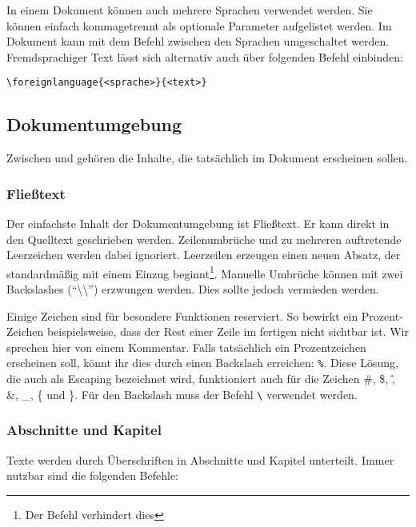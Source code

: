 In einem Dokument können auch mehrere Sprachen verwendet werden.
Sie können einfach kommagetrennt als optionale Parameter aufgelistet werden.
Im Dokument kann mit dem Befehl \texttt{} zwischen den Sprachen umgeschaltet werden.
Fremdsprachiger Text lässt sich alternativ auch über folgenden Befehl einbinden: 
\begin{verbatim}
\foreignlanguage{<sprache>}{<text>}
\end{verbatim}

\subsection{Dokumentumgebung}

Zwischen \texttt{} und \texttt{} gehören die Inhalte, die tatsächlich im Dokument erscheinen sollen.

\subsubsection{Fließtext}
Der einfachste Inhalt der Dokumentumgebung ist Fließtext.
Er kann direkt in den Quelltext geschrieben werden.
Zeilenumbrüche und zu mehreren auftretende Leerzeichen werden dabei ignoriert.
Leerzeilen erzeugen einen neuen Absatz, der standardmäßig mit einem Einzug beginnt\footnote{Der Befehl \texttt{\noindent} verhindert dies}.
Manuelle Umbrüche können mit zwei Backslashes (\enquote{\textbackslash\textbackslash}) erzwungen werden.
Dies sollte jedoch vermieden werden.

Einige Zeichen sind für besondere Funktionen reserviert. 
So bewirkt ein Prozent-Zeichen beispielsweise, dass der Rest einer Zeile im fertigen  nicht sichtbar ist.
Wir sprechen hier von einem Kommentar.
Falls tatsächlich ein Prozentzeichen erscheinen soll, könnt ihr dies durch einen Backslash erreichen: \texttt{\%}.
Diese Lösung, die auch als Escaping bezeichnet wird, funktioniert auch für die Zeichen \#, \$, \^, \&, \_, \{ und \}.
Für den Backslash muss der Befehl \texttt{\textbackslash} verwendet werden.

\subsubsection{Abschnitte und Kapitel}
Texte werden durch Überschriften in Abschnitte und Kapitel unterteilt.
Immer nutzbar sind die folgenden Befehle:

